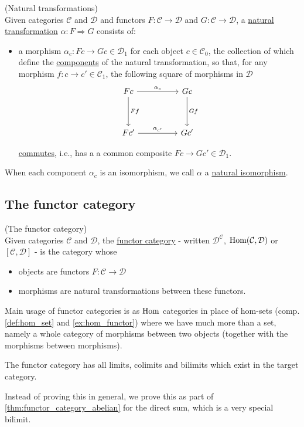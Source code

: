 \begin{definition}{(Natural transformations)}\label{def:natural_transformation}\\
\noindent Given categories $\mathcal{C}$ and $\mathcal{D}$ and functors $F : \mathcal{C} \rightarrow \mathcal{D}$ and
$G : \mathcal{C} \rightarrow \mathcal{D}$, a \ul{natural transformation} $\alpha : F \Rightarrow G$ consists of:
\begin{itemize}
\item a morphism $\alpha_{c} : Fc \rightarrow Gc \in \mathcal{D}_{1}$ for each object $c \in \mathcal{C}_{0}$, the collection of which
define the \ul{components} of the natural transformation, so that, for any morphism $f : c \rightarrow c' \in \mathcal{C}_{1}$, the following
square of morphisms in $\mathcal{D}$
\[\begin{tikzcd}
Fc \arrow[rr, "\alpha_{c}"] \arrow[dd, "Ff"] &  & Gc \arrow[dd, "Gf"] \\
                                             &  &                     \\
Fc' \arrow[rr, "\alpha_{c'}"]                &  & Gc'                
\end{tikzcd}\]

\ul{commutes}, i.e., has a a common composite $Fc \rightarrow Gc' \in \mathcal{D}_{1}$.
\end{itemize}
When each component $\alpha_{c}$ is an isomorphism, we call $\alpha$ a \ul{natural isomorphism}.
\end{definition}

\subsection{The functor category}

\begin{definition}{(The functor category)}\label{def:functor_category}\\
Given categories $\mathcal{C}$ and $\mathcal{D}$, the \ul{functor category} - written $\mathcal{D}^{\mathcal{C}}$, $\textup{Hom}(\mathcal{C},
\mathcal{D})$ or $[\mathcal{C}, \mathcal{D}]$ -
is the category whose
\begin{itemize}
\item objects are functors $F : \mathcal{C} \rightarrow \mathcal{D}$
\item morphisms are natural transformations between these functors.
\end{itemize}
Main usage of functor categories is as $\textup{Hom}$ categories in place of hom-sets (comp. \ref{def:hom_set} and \ref{ex:hom_functor}) where
we have much more than a set, namely a whole category of morphisms between two objects (together with the morphisms between morphisms).
\end{definition}

\begin{theorem}
The functor category has all limits, colimits and bilimits which exist in the target category.
\end{theorem}

Instead of proving this in general, we prove this as part of \ref{thm:functor_category_abelian} for the direct sum, which is a very special bilimit.


